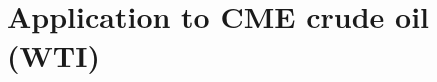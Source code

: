 \documentclass[nolayout]{article}
\theoremstyle{plain}
\theoremstyle{definition}
\newcommand{\1}{\mathbbm{1}}
\begin{document}
%

\section{Application to CME crude oil (WTI)}
\label{sec:crudeoil}
\label{sec:exp}
\end{document}
